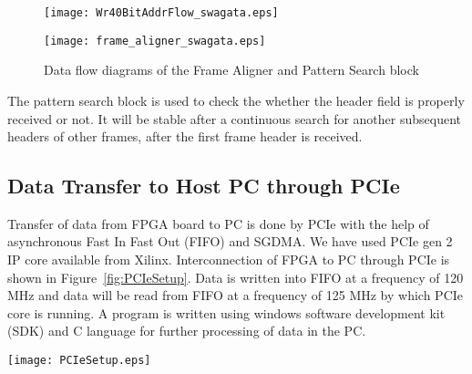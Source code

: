 \documentclass[a4paper]{jpconf}
\begin{document}
\begin{figure}[h]
\begin{minipage}{14pc}\vspace{-5pc}
\texttt{[image: Wr40BitAddrFlow\_swagata.eps]}
\caption{\label{fig:FrameAlignerFlow}Algorithm for Frame Aligner and Pattern Search}
\end{minipage}\hspace{6pc}\begin{minipage}{14pc}\vspace{-4pc}
\vspace{3pc}
\texttt{[image: frame\_aligner\_swagata.eps]}
\caption{\label{fig:FrameAlignerWork}Data flow diagrams of the Frame Aligner and Pattern Search block}
\end{minipage} 
\end{figure}
\vspace{-1 pc}
The pattern search block is used to check the whether the header field is properly received or not. It will be stable after a continuous search for another  subsequent headers of other frames, after the first frame header is received.


\vspace{-1 pc}
\subsection{Data Transfer to Host PC through PCIe}
Transfer of data from FPGA board to PC is done by PCIe with the help of asynchronous Fast In Fast Out (FIFO) and SGDMA. We have used PCIe gen 2 IP core available from Xilinx. Interconnection of FPGA to PC through PCIe is shown in Figure~\ref{fig:PCIeSetup}. Data is written into FIFO at a frequency of 120 MHz and  data will be read from FIFO at a frequency of 125 MHz by which PCIe core is running. A program is written using windows software development kit (SDK) and C language for further processing of data in the PC.  
\begin{figure*}[htb]
\hspace{-2pc}
\texttt{[image: PCIeSetup.eps]}
\vspace{-5 pt}
\caption{ PCIe interfacing with blocks and Experimental setup of proposed DAQ}
\label{fig:PCIeSetup}

\end{figure*}
\vspace{-1 pc}
\end{document}

